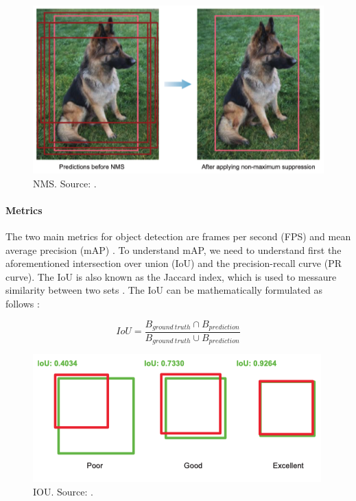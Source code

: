 \documentclass[a4paper, 11pt, oneside]{article}
\begin{document}
  \begin{figure}[ht]
    \begin{center}
      \includegraphics[width=.8\textwidth]{nms.png}
    \end{center}
    \caption{NMS. Source: \cite{elgendy2020deep}.}
  \end{figure}

  \paragraph{Metrics}

  The two main metrics for object detection are frames per second (FPS) and mean average precision (mAP)
  \cite{elgendy2020deep, liu2020deep, geron2019hands, planche2019hands}. To understand mAP, we need to understand first
  the aforementioned intersection over union (IoU) and the precision-recall curve (PR curve). The IoU is also known as
  the Jaccard index, which is used to messaure similarity between two sets \cite{planche2019hands}. The IoU can be
  mathematically formulated as follows \cite{elgendy2020deep, planche2019hands}:

  $$IoU = \frac{B_{ground \ truth} \cap B_{prediction}}{B_{ground \ truth} \cup B_{prediction}}$$

  \begin{figure}[ht]
    \begin{center}
      \includegraphics[width=.6\textwidth]{iou.png}
    \end{center}
    \caption{IOU. Source: \cite{elgendy2020deep}.}
  \end{figure}
\end{document}
